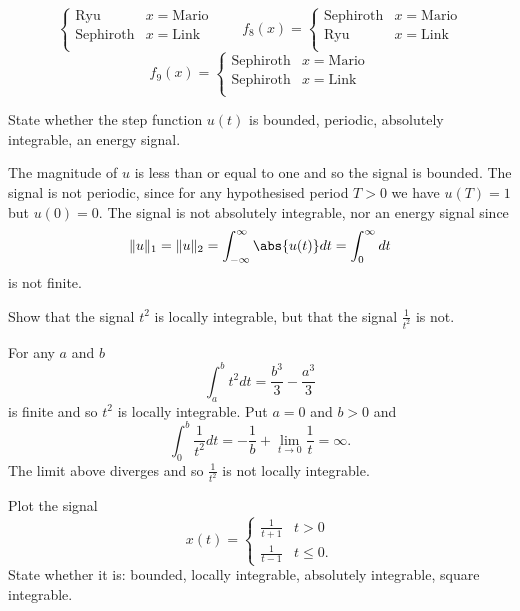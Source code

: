 \begin{excersizelist}
\begin{solution}
\[\begin{cases}
\text{Ryu} & x = \text{Mario} \\
\text{Sephiroth} & x = \text{Link} \\
\end{cases}
\qquad 
f_8(x) = \begin{cases}
\text{Sephiroth} & x = \text{Mario} \\
\text{Ryu} & x = \text{Link} \\
\end{cases}
\]
\[
f_9(x) = \begin{cases}
\text{Sephiroth} & x = \text{Mario} \\
\text{Sephiroth} & x = \text{Link} \\
\end{cases}
\]
\end{solution}

\item \label{excer:stepfunction} State whether the step function $u(t)$ is bounded, periodic, %
absolutely integrable, an energy signal.
\begin{solution}
The magnitude of $u$ is less than or equal to one and so the signal is bounded.  The signal is not periodic, since for any hypothesised period $T > 0$ we have $u(T) = 1$ but $u(0) = 0$.  %
The signal is not absolutely integrable, nor an energy signal since
\[
\|u\|_1 = \|u\|_2 = \int_{-\infty}^\infty \abs{u(t)} dt = \int_{0}^\infty dt
\]
is not finite.
\end{solution}

\item \label{exer:oneontnotlocallyint} Show that the signal $t^2$ is locally integrable, but that the signal $\frac{1}{t^2}$ is not. 

\begin{solution}
For any $a$ and $b$
\[
\int_a^b t^2 dt = \frac{b^3}{3} - \frac{a^3}{3}
\]
is finite and so $t^2$ is locally integrable.  Put $a = 0$ and $b > 0$ and
\[
\int_0^b \frac{1}{t^2} dt = -\frac{1}{b} + \lim_{t \to 0}\frac{1}{t}  = \infty.
\]
The limit above diverges and so $\frac{1}{t^2}$ is not locally integrable. 
\end{solution}


\item \label{exer:functionsquarenotabsint} Plot the signal 
\[
x(t) = \begin{cases}
\tfrac{1}{t+1} & t > 0 \\
\tfrac{1}{t-1} & t \leq 0.
\end{cases}
\]
State whether it is: bounded, locally integrable, absolutely integrable, square integrable.


\end{excersizelist}
